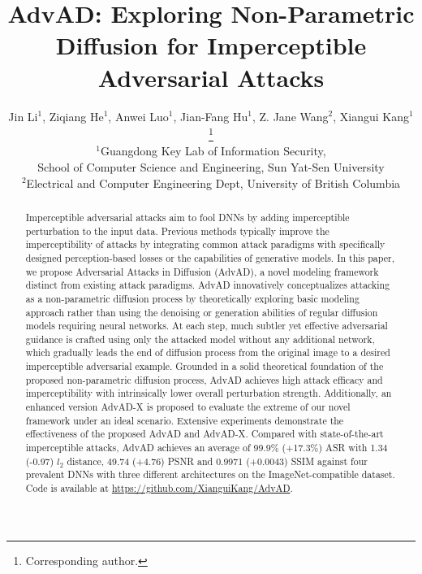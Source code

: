 \documentclass{article}
\title{AdvAD: Exploring Non-Parametric Diffusion for Imperceptible Adversarial Attacks}
\author{
  Jin Li$^{1}$, Ziqiang He$^{1}$, Anwei Luo$^{1}$, Jian-Fang Hu$^{1}$, Z. Jane Wang$^{2}$, Xiangui Kang$^{1}$\thanks{Corresponding author.} \\
  $^{1}$Guangdong Key Lab of Information Security, \\
  School of Computer Science and Engineering, Sun Yat-Sen University \\
  $^{2}$Electrical and Computer Engineering Dept, University of British Columbia \\
}
\begin{document}
\renewcommand{\arraystretch}{0.6}
\setlength{\aboverulesep}{1.25pt} 
\setlength{\belowrulesep}{1.25pt} 

\maketitle


\begin{abstract}
Imperceptible adversarial attacks aim to fool DNNs by adding imperceptible perturbation to the input data. Previous methods typically improve the imperceptibility of attacks by integrating common attack paradigms with specifically designed perception-based losses or the capabilities of generative models. In this paper, we propose Adversarial Attacks in Diffusion (AdvAD), a novel modeling framework distinct from existing attack paradigms. AdvAD innovatively conceptualizes attacking as a non-parametric diffusion process by theoretically exploring basic modeling approach rather than using the denoising or generation abilities of regular diffusion models requiring neural networks. At each step, much subtler yet effective adversarial guidance is crafted using only the attacked model without any additional network, which gradually leads the end of diffusion process from the original image to a desired imperceptible adversarial example. Grounded in a solid theoretical foundation of the proposed non-parametric diffusion process, AdvAD achieves high attack efficacy and imperceptibility with intrinsically lower overall perturbation strength. Additionally, an enhanced version AdvAD-X is proposed to evaluate the extreme of our novel framework under an ideal scenario. Extensive experiments demonstrate the effectiveness of the proposed AdvAD and AdvAD-X. Compared with state-of-the-art imperceptible attacks, AdvAD achieves an average of 99.9$\%$ (+17.3$\%$) ASR with 1.34 (-0.97) $l_2$ distance, 49.74 (+4.76) PSNR and 0.9971 (+0.0043) SSIM against four prevalent DNNs with three different architectures on the ImageNet-compatible dataset. 
Code is available at \url{https://github.com/XianguiKang/AdvAD}.

\end{abstract}
\end{document}
